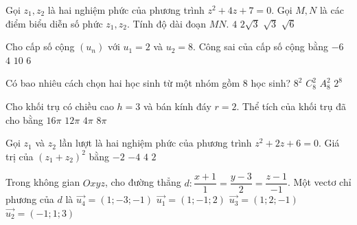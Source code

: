 \begin{ex}%
{\vspace{-0.4cm}

}
\end{ex}
\begin{ex}%
Gọi $z_1, z_2$ là hai nghiệm phức của phương trình $z^2+4 z+7=0$. Gọi $M, N$ là các điểm biểu diễn số phức $z_1, z_2$. Tính độ dài đoạn $MN$.
\choice
{$4$}
{\True $2\sqrt{3}$}
{$\sqrt{3}$}
{$\sqrt{6}$}

\end{ex}
\begin{ex}%
Cho cấp số cộng $\left(u_n\right)$ với $u_1=2$ và $u_2=8$. Công sai của cấp số cộng bằng
\choice
{\True $-6$}
{$4$}
{$10$}
{$6$}

\end{ex}
\begin{ex}%
Có bao nhiêu cách chọn hai học sinh từ một nhóm gồm $8$ học sinh?
\choice
{$8^2$}
{\True $C_8^2$}
{$A_8^2$}
{$2^8$}

\end{ex}
\begin{ex}%
Cho khối trụ có chiều cao $h=3$ và bán kính đáy $r=2$. Thể tích của khối trụ đã cho bằng
\choice
{$16\pi$}
{\True $12\pi$}
{$4\pi$}
{$8\pi$}

\end{ex}
\begin{ex}%
Gọi $z_1$ và $z_2$ lần lượt là hai nghiệm phức của phương trình $z^2+ 2 z+6=0$. Giá trị của $\left(z_1+z_2\right)^2$ bằng
\choice
{$-2$}
{$-4$}
{\True $4$}
{$2$}

\end{ex}
\begin{ex}%
Trong không gian $O x y z$, cho đường thẳng $d\colon \dfrac{x+1}{1}=\dfrac{y-3}{2}=\dfrac{z-1}{-1}$. Một vectơ chỉ phương của $d$ là
\choice
{$\overrightarrow{u_4}=(1;-3;-1)$}
{\True $\overrightarrow{u_1}=(1;-1; 2)$}
{$\overrightarrow{u_3}=(1; 2;-1)$}
{$\overrightarrow{u_2}=(-1; 1; 3)$}

\end{ex}
